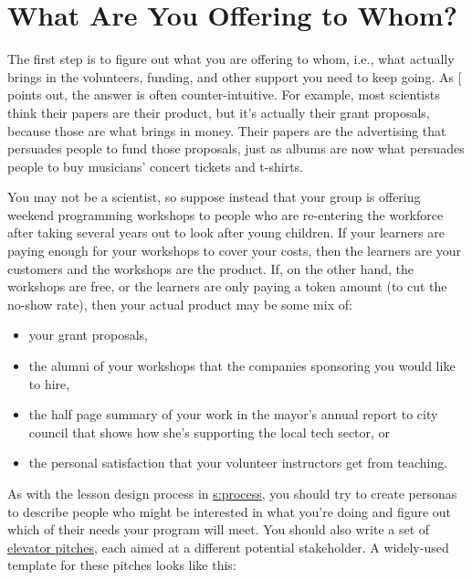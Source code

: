\section{What Are You Offering to Whom?}\label{s:marketing-what-whom}

The first step is to figure out what you are offering to whom, i.e.,
what actually brings in the volunteers, funding, and other support you
need to keep going. As {[}\protect[\hyperlink{b:Kuch2011}{Kuch2011}]{]} points out, the answer is
often counter-intuitive. For example, most scientists think their papers
are their product, but it's actually their grant proposals, because
those are what brings in money. Their papers are the advertising that
persuades people to fund those proposals, just as albums are now what
persuades people to buy musicians' concert tickets and t-shirts.

You may not be a scientist, so suppose instead that your group is
offering weekend programming workshops to people who are re-entering the
workforce after taking several years out to look after young children.
If your learners are paying enough for your workshops to cover your
costs, then the learners are your customers and the workshops are the
product. If, on the other hand, the workshops are free, or the learners
are only paying a token amount (to cut the no-show rate), then your
actual product may be some mix of:

\begin{itemize}
\item
  your grant proposals,
\item
  the alumni of your workshops that the companies sponsoring you would
  like to hire,
\item
  the half page summary of your work in the mayor's annual report to
  city council that shows how she's supporting the local tech sector,
  or
\item
  the personal satisfaction that your volunteer instructors get from
  teaching.
\end{itemize}

As with the lesson design process in \protect\hyperlink{CHAPTER}{s:process}, you should
try to create personas to describe people who might be interested in
what you're doing and figure out which of their needs your program
will meet. You should also write a set of \protect\hyperlink{g:elevator-pitch}{elevator
pitches}, each aimed at a different potential
stakeholder. A widely-used template for these pitches looks like this:

